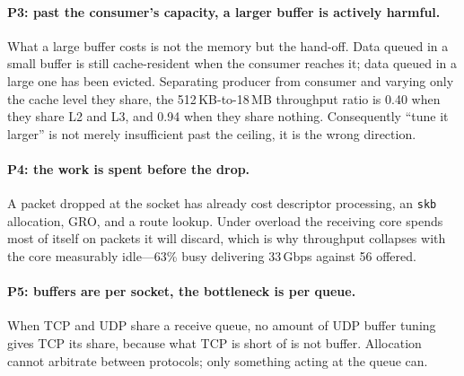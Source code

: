 \paragraph{P3: past the consumer's capacity, a larger buffer is actively
harmful.} What a large buffer costs is not the memory but the hand-off. Data
queued in a small buffer is still cache-resident when the consumer reaches it;
data queued in a large one has been evicted. Separating producer from consumer
and varying only the cache level they share, the 512\,KB-to-18\,MB throughput
ratio is 0.40 when they share L2 and L3, and 0.94 when they share nothing.
Consequently ``tune it larger'' is not merely insufficient past the ceiling, it
is the wrong direction.

\paragraph{P4: the work is spent before the drop.} A packet dropped at the
socket has already cost descriptor processing, an \texttt{skb} allocation, GRO,
and a route lookup. Under overload the receiving core spends most of itself on
packets it will discard, which is why throughput collapses with the core
measurably idle---63\% busy delivering 33\,Gbps against 56 offered.

\paragraph{P5: buffers are per socket, the bottleneck is per queue.} When TCP
and UDP share a receive queue, no amount of UDP buffer tuning gives TCP its
share, because what TCP is short of is not buffer. Allocation cannot arbitrate
between protocols; only something acting at the queue can.
